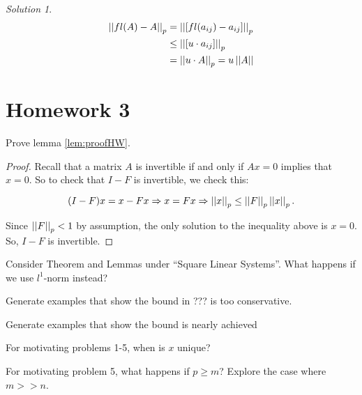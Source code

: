 \documentclass[]{book}
\theoremstyle{definition}
\theoremstyle{definition}
\theoremstyle{definition}
\theoremstyle{remark}
\newtheorem*{solution}{Solution}
\let\BeginKnitrBlock\begin \let\EndKnitrBlock\end
\begin{document}
\begin{solution}
\begin{align*}
  \left | \left | fl(A) - A \right | \right |_p &= \left|\left| \left [ fl(a_{ij}) - a_{ij} \right ] \right|\right|_p \\
                                                &\leq \left|\left| \left[u\cdot a_{ij}\right]\right|\right|_p \\
                                                &= \left \vert \left \vert u\cdot A \right \vert \right \vert_p = u\left|\left|A\right|\right|
\end{align*}
\end{solution}

\section{Homework 3}\label{homework-3}

\BeginKnitrBlock{exercise}
\protect\hypertarget{exr:q301}{}{\label{exr:q301} }Prove lemma
\ref{lem:proofHW}.
\EndKnitrBlock{exercise}

\BeginKnitrBlock{proof}
\iffalse{} {Proof. } \fi{}Recall that a matrix \(A\) is invertible if
and only if \(Ax = 0\) implies that \(x = 0\). So to check that \(I-F\)
is invertible, we check this:

\[
  (I-F)x = x-Fx \Rightarrow x = Fx \Rightarrow \left \vert \left \vert x \right \vert \right \vert_p \leq \left \vert \left \vert F \right \vert \right \vert_p \left \vert \left \vert x \right \vert \right \vert_p.
\]

Since \(\left \vert \left \vert F \right \vert \right \vert_p < 1\) by assumption, the only solution to the
inequality above is \(x = 0\). So, \(I-F\) is invertible.
\EndKnitrBlock{proof}

\BeginKnitrBlock{exercise}
\protect\hypertarget{exr:q302}{}{\label{exr:q302} }Consider Theorem and
Lemmas under ``Square Linear Systems''. What happens if we use
\(l^{1}\)-norm instead?
\EndKnitrBlock{exercise}

\BeginKnitrBlock{exercise}
\protect\hypertarget{exr:q303}{}{\label{exr:q303} }Generate examples that
show the bound in ??? is too conservative.
\EndKnitrBlock{exercise}

\BeginKnitrBlock{exercise}
\protect\hypertarget{exr:q304}{}{\label{exr:q304} }Generate examples that
show the bound is nearly achieved
\EndKnitrBlock{exercise}

\BeginKnitrBlock{exercise}
\protect\hypertarget{exr:q305}{}{\label{exr:q305} }For motivating problems
1-5, when is \(x\) unique?
\EndKnitrBlock{exercise}

\BeginKnitrBlock{exercise}
\protect\hypertarget{exr:q306}{}{\label{exr:q306} }For motivating problem 5,
what happens if \(p\geq m\)? Explore the case where \(m >> n\).
\EndKnitrBlock{exercise}
\end{document}

